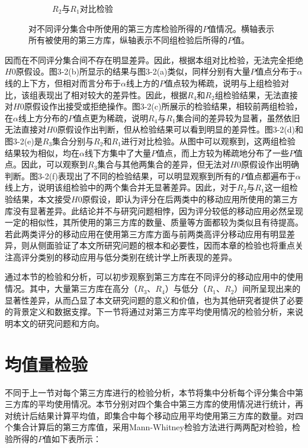 \begin{figure}
\begin{subfigure}[b]{0.49\textwidth}
		\caption{$R_2$与$R_1$对比检验}
	\end{subfigure}
	\caption{对不同评分集合中所使用的第三方库检验所得的$P$值情况。横轴表示所有被使用的第三方库，纵轴表示不同组检验后所得的$P$值。}
\end{figure}
因而在不同评分集合间不存在明显差异。因此，根据本组对比检验，无法完全拒绝$H0$原假设。图3-2(b)所显示的结果与图3-2(a)类似，同样分别有大量$P$值点分布于$\alpha$线的上下方，但相对而言分布于$\alpha$线上方的$P$值点较为稀疏，说明与上组检验对比，该组表现出了相对较大的差异性。因此，根据$R_4$和$R_2$组检验结果，无法直接对$H0$原假设作出接受或拒绝操作。图3-2(c)所展示的检验结果，相较前两组检验，在$\alpha$线上方分布的$P$值点更为稀疏，说明$R_4$与$R_1$集合间的差异较为显著，虽然依旧无法直接对$H0$原假设作出判断，但从检验结果可以看到明显的差异性。图3-2(d)和图3-2(e)是$R_3$集合分别与$R_2$和$R_1$进行对比检验。从图中可以观察到，这两组检验结果较为相似，均在$\alpha$线下方集中了大量$P$值点，而上方较为稀疏地分布了一些$P$值点。因此，可以观察到$R_3$集合与其他两集合的差异，但无法对$H0$原假设作出明确判断。图3-2(f)表现出了不同的检验结果，可以明显观察到所有的$P$值点都遍布于$\alpha$线上方，说明该组检验中的两个集合并无显著差异。因此，对于$R_2$与$R_1$这一组检验结果，本文接受$H0$原假设，即认为评分在后两类中的移动应用所使用的第三方库没有显著差异。此结论并不与研究问题相悖，因为评分较低的移动应用必然呈现一定的相似性，其所使用的第三方库的数量、质量等方面都较为类似且有待提高。若此两类评分的移动应用在使用第三方库方面与前两类高评分移动应用有明显差异，则从侧面验证了本文所研究问题的根本和必要性，因而本章的检验也将重点关注高评分类别的移动应用与低分类别在统计学上所表现的差异。

通过本节的检验和分析，可以初步观察到第三方库在不同评分的移动应用中的使用情况。其中，大量第三方库在高分（$R_3$、$R_4$）与低分（$R_1$、$R_2$）间所呈现出来的显著性差异，从而凸显了本文研究问题的意义和价值，也为其他研究者提供了必要的背景定义和数据支撑。下一节将通过对第三方库平均使用情况的检验分析，来说明本文的研究问题和方向。



\section{均值量检验}
不同于上一节对每个第三方库进行的检验分析，本节将集中分析每个评分集合中第三方库的平均使用情况。本节分别对四个集合中第三方库的使用情况进行统计，再对统计后结果计算平均值，即集合中每个移动应用平均使用第三方库的数量。对四个集合计算后的第三方库值，采用Mann-Whitney检验方法进行两两配对检验，检验所得的$P$值如下表所示：

